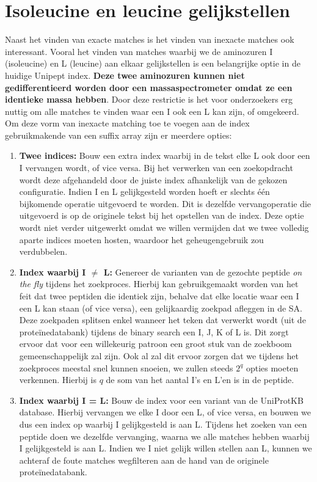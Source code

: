 \section{Isoleucine en leucine gelijkstellen}\label{sec:isoleucine-en-leucine-equivalentie}
Naast het vinden van exacte matches is het vinden van inexacte matches ook interessant.
Vooral het vinden van matches waarbij we de aminozuren I (isoleucine) en L (leucine) aan elkaar gelijkstellen is een belangrijke optie in de huidige Unipept index.
\textbf{Deze twee aminozuren kunnen niet gedifferentieerd worden door een massaspectrometer omdat ze een identieke massa hebben}.
Door deze restrictie is het voor onderzoekers erg nuttig om alle matches te vinden waar een I ook een L kan zijn, of omgekeerd.
Om deze vorm van inexacte matching toe te voegen aan de index gebruikmakende van een suffix array zijn er meerdere opties:
\begin{enumerate}
    \item \textbf{Twee indices:} Bouw een extra index waarbij in de tekst elke L ook door een I vervangen wordt, of vice versa.
    Bij het verwerken van een zoekopdracht wordt deze afgehandeld door de juiste index afhankelijk van de gekozen configuratie.
    Indien I en L gelijkgesteld worden hoeft er slechts één bijkomende operatie uitgevoerd te worden.
    Dit is dezelfde vervangoperatie die uitgevoerd is op de originele tekst bij het opstellen van de index.
    Deze optie wordt niet verder uitgewerkt omdat we willen vermijden dat we twee volledig aparte indices moeten hosten, waardoor het geheugengebruik zou verdubbelen.
    \item \textbf{Index waarbij I $\neq$ L:} Genereer de varianten van de gezochte peptide \textit{on the fly} tijdens het zoekproces.
    Hierbij kan gebruikgemaakt worden van het feit dat twee peptiden die identiek zijn, behalve dat elke locatie waar een I een L kan staan (of vice versa), een gelijkaardig zoekpad afleggen in de SA\@.
    Deze zoekpaden splitsen enkel wanneer het teken dat verwerkt wordt (uit de proteïnedatabank) tijdens de binary search een I, J, K of L is.
    Dit zorgt ervoor dat voor een willekeurig patroon een groot stuk van de zoekboom gemeenschappelijk zal zijn.
    Ook al zal dit ervoor zorgen dat we tijdens het zoekproces meestal snel kunnen snoeien, we zullen steeds $2^{q}$ opties moeten verkennen.
    Hierbij is $q$ de som van het aantal I's en L'en is in de peptide.
    \item \textbf{Index waarbij I = L:} Bouw de index voor een variant van de UniProtKB database.
    Hierbij vervangen we elke I door een L, of vice versa, en bouwen we dus een index op waarbij I gelijkgesteld is aan L\@.
    Tijdens het zoeken van een peptide doen we dezelfde vervanging, waarna we alle matches hebben waarbij I gelijkgesteld is aan L\@.
    Indien we I niet gelijk willen stellen aan L, kunnen we achteraf de foute matches wegfilteren aan de hand van de originele proteïnedatabank.
\end{enumerate}

